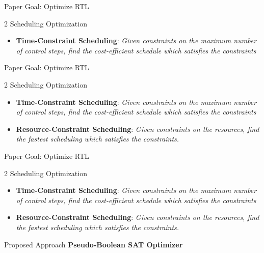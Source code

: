 \documentclass{beamer}
\begin{document}
\begin{frame}[fragile]{Paper Goal: Optimize RTL}
  \begin{block}{2 Scheduling Optimization}
    \begin{itemize}
      \item \textbf{Time-Constraint Scheduling}: \textit{Given constraints on the maximum number
      of control steps, find the cost-efficient schedule which satisfies the constraints}
    \end{itemize}
  \end{block}
\end{frame}

\begin{frame}[fragile]{Paper Goal: Optimize RTL}
  \begin{block}{2 Scheduling Optimization}
    \begin{itemize}
      \item \textbf{Time-Constraint Scheduling}: \textit{Given constraints on the maximum number
      of control steps, find the cost-efficient schedule which satisfies the constraints}
      \item \textbf{Resource-Constraint Scheduling}: \textit{Given constraints on the resources,
      find the fastest scheduling which satisfies the constraints.}
    \end{itemize}
  \end{block}
\end{frame}

\begin{frame}[fragile]{Paper Goal: Optimize RTL}
  \begin{block}{2 Scheduling Optimization}
    \begin{itemize}
      \item \textbf{Time-Constraint Scheduling}: \textit{Given constraints on the maximum number
      of control steps, find the cost-efficient schedule which satisfies the constraints}
      \item \textbf{Resource-Constraint Scheduling}: \textit{Given constraints on the resources,
      find the fastest scheduling which satisfies the constraints.}
    \end{itemize}
  \end{block}

  \begin{block}{Proposed Approach}
    \centering\textbf{Pseudo-Boolean SAT Optimizer}
  \end{block}
\end{frame}
\end{document}
